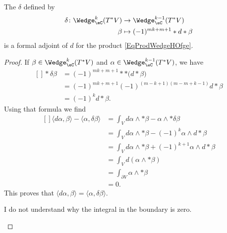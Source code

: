 \begin{lemma}
	The  $\delta$ defined by
	\begin{equation}
		\begin{aligned}[]
			\delta	\colon \Wedge^k_{\eC}(T^*V) & \to \Wedge_{\eC}^{k-1}(T^*V)  \\
			\beta                             & \mapsto (-1)^{mk+m+1}*d*\beta
		\end{aligned}
	\end{equation}
	is a formal adjoint of $d$ for the product \eqref{EqProdWedgeHOfge}.
\end{lemma}

\begin{proof}
	If $\beta\in\Wedge_{\eC}^k(T^*V)$ and $\alpha\in\Wedge_{\eC}^{k-1}(T^*V)$, we have
	\begin{equation}
		\begin{aligned}[]
			*\delta\beta & =(-1)^{mk+m+1}* *\big( d*\beta \big)         \\
			             & =(-1)^{mk+m+1}(-1)^{(m-k+1)(m-m+k-1)}d*\beta \\
			             & =(-1)^kd*\beta.
		\end{aligned}
	\end{equation}
	Using that formula we find
	\begin{equation}
		\begin{aligned}[]
			\langle d\alpha, \beta\rangle -\langle \alpha, \delta\beta\rangle & =\int_V d\alpha\wedge *\beta-\alpha\wedge *\delta\beta     \\
			                                                                  & =\int_Vd\alpha\wedge *\beta-(-1)^k\alpha\wedge d*\beta     \\
			                                                                  & =\int_Vd\alpha\wedge *\beta+(-1)^{k+1}\alpha\wedge d*\beta \\
			                                                                  & =\int_Vd(\alpha\wedge *\beta)                              \\
			                                                                  & =\int_{\partial V}\alpha\wedge *\beta                      \\
			                                                                  & =0.
		\end{aligned}
	\end{equation}
	This proves that $\langle d\alpha, \beta\rangle =\langle \alpha, \delta\beta\rangle$.
	\begin{probleme}
		I do not understand why the integral in the boundary is zero.
	\end{probleme}
\end{proof}

